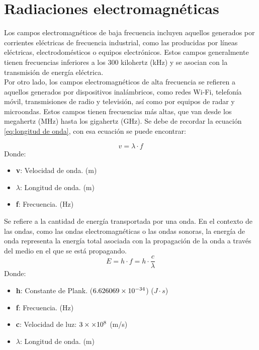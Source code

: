 \documentclass[
	12pt, %
	fleqn, %
	a4paper, %
	oneside, %
]{LegrandOrangeBook}
\begin{document}
\section{Radiaciones electromagnéticas}
Los campos electromagnéticos de baja frecuencia incluyen aquellos generados por corrientes eléctricas de frecuencia industrial, como las producidas por líneas eléctricas, electrodomésticos o equipos electrónicos. Estos campos generalmente tienen frecuencias inferiores a los 300 kilohertz (kHz) y se asocian con la transmisión de energía eléctrica.\\
Por otro lado, los campos electromagnéticos de alta frecuencia se refieren a aquellos generados por dispositivos inalámbricos, como redes Wi-Fi, telefonía móvil, transmisiones de radio y televisión, así como por equipos de radar y microondas. Estos campos tienen frecuencias más altas, que van desde los megahertz (MHz) hasta los gigahertz (GHz).
Se debe de recordar la ecuación \ref{eq:longitud de onda}, con esa ecuación se puede encontrar:
\begin{definition}
\begin{equation}
v=\lambda\cdot f
\label{eq:vel onda}
\end{equation}
Donde:
\begin{itemize}
\item \textbf{v}: Velocidad de onda. (m)
\item $\lambda$: Longitud de onda. (m)
\item \textbf{f}: Frecuencia. (Hz)
\end{itemize}
\end{definition}
\begin{definition}
Se refiere a la cantidad de energía transportada por una onda. En el contexto de las ondas, como las ondas electromagnéticas o las ondas sonoras, la energía de onda representa la energía total asociada con la propagación de la onda a través del medio en el que se está propagando.
\begin{equation}
E=h\cdot f=h\cdot\frac{c}{\lambda}
\end{equation}
Donde:
\begin{itemize}
\item \textbf{h}: Constante de Plank. ($6.626069\times 10^{-34}$) ($J\cdot s$)
\item \textbf{f}: Frecuencia. (Hz)
\item \textbf{c}: Velocidad de luz: $3\times\times 10^{8}$ (m/s)
\item $\lambda$: Longitud de onda. (m)
\end{itemize}
\end{definition}
\end{document}
